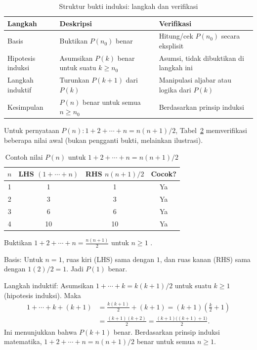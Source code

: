 \begin{table}[htbp]
\centering
\small
\begin{tabular}{|>{\raggedright\arraybackslash}p{2.2cm}|>{\raggedright\arraybackslash}p{4.2cm}|>{\raggedright\arraybackslash}p{4.2cm}|}
\hline
\textbf{Langkah} & \textbf{Deskripsi} & \textbf{Verifikasi} \\
\hline
Basis & Buktikan $P(n_0)$ benar & Hitung/cek $P(n_0)$ secara eksplisit \\
\hline
Hipotesis induksi & Asumsikan $P(k)$ benar untuk suatu $k \geq n_0$ & Asumsi, tidak dibuktikan di langkah ini \\
\hline
Langkah induktif & Turunkan $P(k+1)$ dari $P(k)$ & Manipulasi aljabar atau logika dari $P(k)$ \\
\hline
Kesimpulan & $P(n)$ benar untuk semua $n \geq n_0$ & Berdasarkan prinsip induksi \\
\hline
\end{tabular}
\caption{Struktur bukti induksi: langkah dan verifikasi}
\label{tab:struktur-induksi}
\end{table}

Untuk pernyataan $P(n): 1 + 2 + \cdots + n = n(n+1)/2$, Tabel~\ref{tab:nilai-Pn} memverifikasi beberapa nilai awal (bukan pengganti bukti, melainkan ilustrasi).

\begin{table}[htbp]
\centering
\small
\begin{tabular}{|c|c|c|c|}
\hline
\textbf{$n$} & \textbf{LHS $(1+\cdots+n)$} & \textbf{RHS $n(n+1)/2$} & \textbf{Cocok?} \\
\hline
1 & 1 & 1 & Ya \\
\hline
2 & 3 & 3 & Ya \\
\hline
3 & 6 & 6 & Ya \\
\hline
4 & 10 & 10 & Ya \\
\hline
\end{tabular}
\caption{Contoh nilai $P(n)$ untuk $1+2+\cdots+n = n(n+1)/2$}
\label{tab:nilai-Pn}
\end{table}

\begin{contoh}
Buktikan $1 + 2 + \cdots + n = \frac{n(n+1)}{2}$ untuk $n \geq 1$ \cite{levin_discrete,brilliant_induction}.

Basis: Untuk $n=1$, ruas kiri (LHS) sama dengan $1$, dan ruas kanan (RHS) sama dengan $1(2)/2 = 1$. Jadi $P(1)$ benar.

Langkah induktif: Asumsikan $1+\cdots+k = k(k+1)/2$ untuk suatu $k \geq 1$ (hipotesis induksi). Maka
\begin{align*}
1+\cdots+k+(k+1)
  &= \frac{k(k+1)}{2} + (k+1)
  = (k+1)\left(\frac{k}{2}+1\right)\\
  &= \frac{(k+1)(k+2)}{2}
  = \frac{(k+1)\big((k+1)+1\big)}{2}.
\end{align*}
Ini menunjukkan bahwa $P(k+1)$ benar. Berdasarkan prinsip induksi matematika, $1 + 2 + \cdots + n = n(n+1)/2$ benar untuk semua $n \geq 1$.
\end{contoh}

